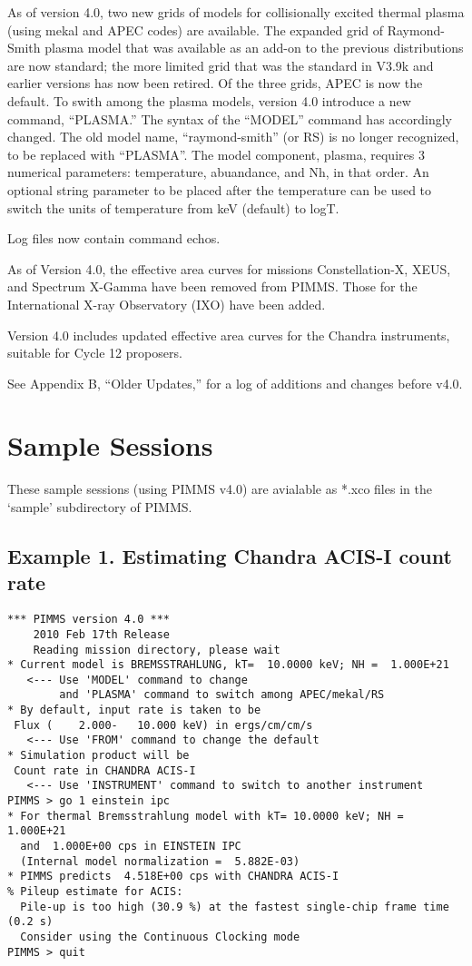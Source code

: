 As of version 4.0, two new grids of models for collisionally excited thermal
plasma (using mekal and APEC codes) are available.  The expanded grid of
Raymond-Smith plasma model that was available as an add-on to the previous
distributions are now standard; the more limited grid that was the standard
in V3.9k and earlier versions has now been retired.  Of the three grids,
APEC is now the default.  To swith among the plasma models, version 4.0
introduce a new command, ``PLASMA.''  The syntax of the ``MODEL'' command
has accordingly changed.  The old model name, ``raymond-smith'' (or RS) is
no longer recognized, to be replaced with ``PLASMA''.  The model component,
plasma, requires 3 numerical parameters: temperature, abuandance, and Nh,
in that order.  An optional string parameter to be placed after the
temperature can be used to switch the units of temperature from keV
(default) to logT.

Log files now contain command echos.

As of Version 4.0, the effective area curves for missions Constellation-X,
XEUS, and Spectrum X-Gamma have been removed from PIMMS.  Those for the
International X-ray Observatory (IXO) have been added.

Version 4.0 includes updated effective area curves for the Chandra
instruments, suitable for Cycle 12 proposers.

See Appendix B, ``Older Updates,'' for a log of additions and changes
before v4.0.

\section{Sample Sessions}

These sample sessions (using PIMMS v4.0) are avialable as *.xco files
in the `sample' subdirectory of PIMMS.

\subsection*{Example 1. Estimating Chandra ACIS-I count rate}

\begin{verbatim}
*** PIMMS version 4.0 ***
    2010 Feb 17th Release
    Reading mission directory, please wait
* Current model is BREMSSTRAHLUNG, kT=  10.0000 keV; NH =  1.000E+21
   <--- Use 'MODEL' command to change
        and 'PLASMA' command to switch among APEC/mekal/RS
* By default, input rate is taken to be
 Flux (    2.000-   10.000 keV) in ergs/cm/cm/s
   <--- Use 'FROM' command to change the default
* Simulation product will be
 Count rate in CHANDRA ACIS-I
   <--- Use 'INSTRUMENT' command to switch to another instrument
PIMMS > go 1 einstein ipc
* For thermal Bremsstrahlung model with kT= 10.0000 keV; NH =  1.000E+21
  and  1.000E+00 cps in EINSTEIN IPC
  (Internal model normalization =  5.882E-03)
* PIMMS predicts  4.518E+00 cps with CHANDRA ACIS-I
% Pileup estimate for ACIS:
  Pile-up is too high (30.9 %) at the fastest single-chip frame time (0.2 s)
  Consider using the Continuous Clocking mode
PIMMS > quit
\end{verbatim}

